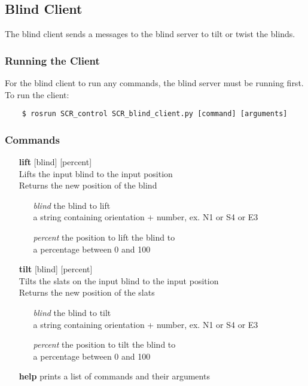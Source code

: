 \documentclass[twoside]{article}
\begin{document}
	\subsection{Blind Client}
	The blind client sends a messages to the blind server to tilt or twist the blinds.\\
	\subsubsection{Running the Client}
	For the blind client to run any commands, the blind server must be running first.\\
	To run the client:
	\begin{verbatim}
	$ rosrun SCR_control SCR_blind_client.py [command] [arguments]
	\end{verbatim}
	\subsubsection{Commands}
	\begin{enumerate}
		\item[\bf lift] [blind] [percent]\\
		Lifts the input blind to the input position\\
		Returns the new position of the blind
		\begin{enumerate}[leftmargin=3\parindent]
			\item[\it blind] the blind to lift\\
			a string containing orientation + number, ex. N1 or S4 or E3
			\item[\it percent] the position to lift the blind to\\
			a percentage between 0 and 100
		\end{enumerate}
		\item[\bf tilt] [blind] [percent]\\
		Tilts the slats on the input blind to the input position\\
		Returns the new position of the slats
		\begin{enumerate}[leftmargin=3\parindent]
			\item[\it blind] the blind to tilt\\
			a string containing orientation + number, ex. N1 or S4 or E3
			\item[\it percent] the position to tilt the blind to\\
			a percentage between 0 and 100
		\end{enumerate}
		\item[\bf help] prints a list of commands and their arguments
	\end{enumerate}
	
\end{document}
